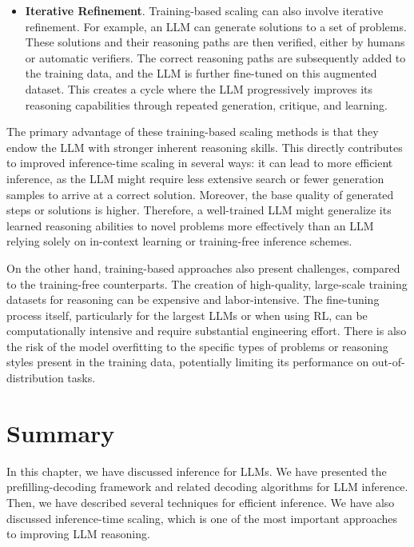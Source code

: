 \begin{itemize}
\item \vspace{0.3em} \textbf{Iterative Refinement}. Training-based scaling can also involve iterative refinement. For example, an LLM can generate solutions to a set of problems. These solutions and their reasoning paths are then verified, either by humans or automatic verifiers. The correct reasoning paths are subsequently added to the training data, and the LLM is further fine-tuned on this augmented dataset. This creates a cycle where the LLM progressively improves its reasoning capabilities through repeated generation, critique, and learning.
\end{itemize}
\vspace{0.5em}

The primary advantage of these training-based scaling methods is that they endow the LLM with stronger inherent reasoning skills. This directly contributes to improved inference-time scaling in several ways: it can lead to more efficient inference, as the LLM might require less extensive search or fewer generation samples to arrive at a correct solution. Moreover, the base quality of generated steps or solutions is higher. Therefore, a well-trained LLM might generalize its learned reasoning abilities to novel problems more effectively than an LLM relying solely on in-context learning or training-free inference schemes.

On the other hand, training-based approaches also present challenges, compared to the training-free counterparts. The creation of high-quality, large-scale training datasets for reasoning can be expensive and labor-intensive. The fine-tuning process itself, particularly for the largest LLMs or when using RL, can be computationally intensive and require substantial engineering effort. There is also the risk of the model overfitting to the specific types of problems or reasoning styles present in the training data, potentially limiting its performance on out-of-distribution tasks.


\section{Summary}

In this chapter, we have discussed inference for LLMs. We have presented the prefilling-decoding framework and related decoding algorithms for LLM inference. Then, we have described several techniques for efficient inference. We have also discussed inference-time scaling, which is one of the most important approaches to improving LLM reasoning.

